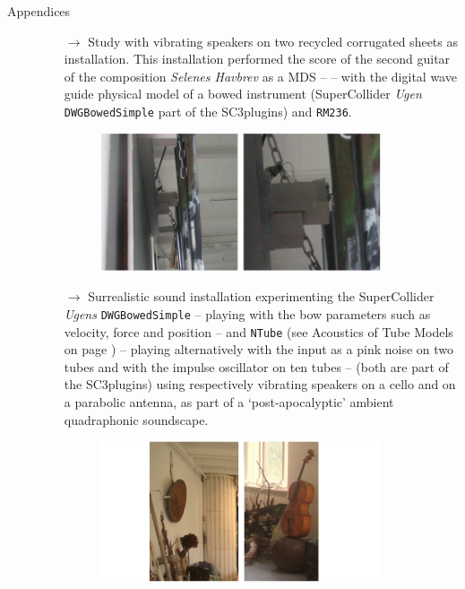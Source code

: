 \begin{description}
\item[Appendices] \hfill 
\begin{itemize}
\item[$\rightarrow$] Study with vibrating speakers on two recycled corrugated sheets as installation. This installation performed the score of the second guitar of the composition \textsl{Selenes Havbrev} as a MDS -- \textsl{} -- with the digital wave guide physical model of a bowed instrument (SuperCollider \textsl{Ugen} \texttt{DWGBowedSimple} part of the SC3plugins) and \texttt{RM236}.\\
\begin{figure}[H]
\hfill \includegraphics[width=0.87\textwidth]{mp/img/vs1a}
\end{figure}

\item[$\rightarrow$] Surrealistic sound installation experimenting the SuperCollider \textsl{Ugens} \texttt{DWGBowedSimple} -- playing with the bow parameters such as velocity, force and position --  and \texttt{NTube} (see Acoustics of Tube Models on page \pageref{atm}) -- playing alternatively with the input as a pink noise on two tubes and with the impulse oscillator on ten tubes -- (both are part of the SC3plugins) using respectively vibrating speakers on a cello and on a parabolic antenna, as part of a `post-apocalyptic' ambient quadraphonic soundscape.\\
\begin{figure}[H]
\hfill \includegraphics[width=0.87\textwidth]{mp/img/asc}
\end{figure}

\end{itemize}
\end{description}

